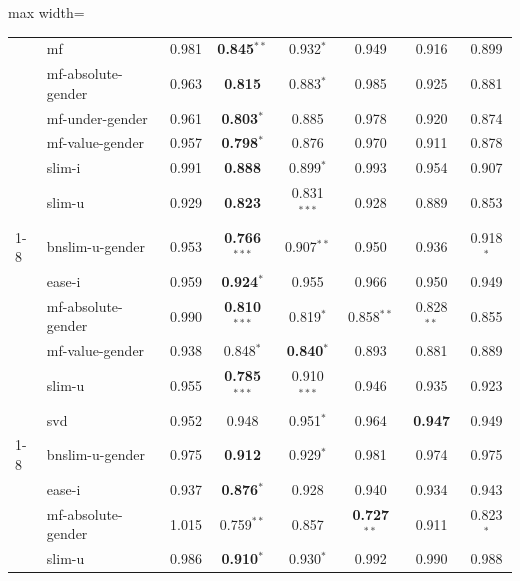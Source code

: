 \begin{table}
\begin{adjustbox}{max width=\textwidth}
\begin{tabular}{llcccccc}
 & mf & 0.981 & \textbf{0.845}$^{**}$ & 0.932$^{*}$ & 0.949 & 0.916 & 0.899 \\
 & mf-absolute-gender & 0.963 & \textbf{0.815} & 0.883$^{*}$ & 0.985 & 0.925 & 0.881 \\
 & mf-under-gender & 0.961 & \textbf{0.803}$^{*}$ & 0.885 & 0.978 & 0.920 & 0.874 \\
 & mf-value-gender & 0.957 & \textbf{0.798}$^{*}$ & 0.876 & 0.970 & 0.911 & 0.878 \\
 & slim-i & 0.991 & \textbf{0.888} & 0.899$^{*}$ & 0.993 & 0.954 & 0.907 \\
 & slim-u & 0.929 & \textbf{0.823} & 0.831$^{***}$ & 0.928 & 0.889 & 0.853 \\
\cmidrule(lr){1-8}
\multirow{6}{*}{FTKY} & bnslim-u-gender & 0.953 & \textbf{0.766}$^{***}$ & 0.907$^{**}$ & 0.950 & 0.936 & 0.918$^{*}$ \\
 & ease-i & 0.959 & \textbf{0.924}$^{*}$ & 0.955 & 0.966 & 0.950 & 0.949 \\
 & mf-absolute-gender & 0.990 & \textbf{0.810}$^{***}$ & 0.819$^{*}$ & 0.858$^{**}$ & 0.828$^{**}$ & 0.855 \\
 & mf-value-gender & 0.938 & 0.848$^{*}$ & \textbf{0.840}$^{*}$ & 0.893 & 0.881 & 0.889 \\
 & slim-u & 0.955 & \textbf{0.785}$^{***}$ & 0.910$^{***}$ & 0.946 & 0.935 & 0.923 \\
 & svd & 0.952 & 0.948 & 0.951$^{*}$ & 0.964 & \textbf{0.947} & 0.949 \\
\cmidrule(lr){1-8}
\multirow{4}{*}{FNYC} & bnslim-u-gender & 0.975 & \textbf{0.912} & 0.929$^{*}$ & 0.981 & 0.974 & 0.975 \\
 & ease-i & 0.937 & \textbf{0.876}$^{*}$ & 0.928 & 0.940 & 0.934 & 0.943 \\
 & mf-absolute-gender & 1.015 & 0.759$^{**}$ & 0.857 & \textbf{0.727}$^{**}$ & 0.911 & 0.823$^{*}$ \\
 & slim-u & 0.986 & \textbf{0.910}$^{*}$ & 0.930$^{*}$ & 0.992 & 0.990 & 0.988 \\
\bottomrule
\end{tabular}
\end{adjustbox}
\end{table}
